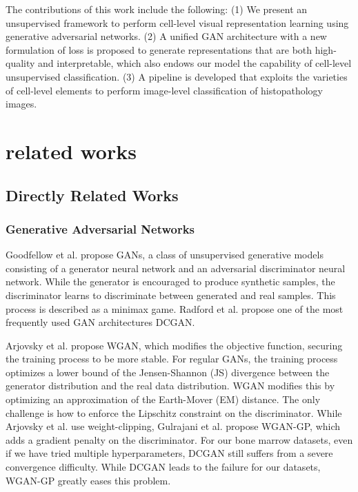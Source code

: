 \documentclass[journal]{IEEEtran}
\begin{document}
The contributions of this work include the following: (1) We present an unsupervised framework to perform cell-level visual representation learning using generative adversarial networks. (2) A unified GAN architecture with a new formulation of loss is proposed to generate representations that are both high-quality and interpretable, which also endows our model the capability of cell-level unsupervised classification. (3) A pipeline is developed that exploits the varieties of cell-level elements to perform image-level classification of histopathology images.













\section{related works}

\subsection{Directly Related Works}
\subsubsection{Generative Adversarial Networks}

Goodfellow et al. \cite{goodfellow2014generative} propose GANs, a class of unsupervised generative models consisting of a generator neural network and an adversarial discriminator neural network. While the generator is encouraged to produce synthetic samples, the discriminator learns to discriminate between generated and real samples. This process is described as a minimax game. Radford et al. \cite{radford2015unsupervised} propose one of the most frequently used GAN architectures DCGAN.

Arjovsky et al. \cite{arjovsky2017wasserstein} propose WGAN, which modifies the objective function, securing the training process to be more stable. For regular GANs, the training process optimizes a lower bound of the Jensen-Shannon (JS) divergence between the generator distribution and the real data distribution. WGAN modifies this by optimizing an approximation of the Earth-Mover (EM) distance. The only challenge is how to enforce the Lipschitz constraint on the discriminator. While Arjovsky et al. \cite{arjovsky2017wasserstein} use weight-clipping, Gulrajani et al. \cite{gulrajani2017improved} propose WGAN-GP, which adds a gradient penalty on the discriminator. For our bone marrow datasets, even if we have tried multiple hyperparameters, DCGAN still suffers from a severe convergence difficulty. While DCGAN leads to the failure for our datasets, WGAN-GP greatly eases this problem.
\end{document}
